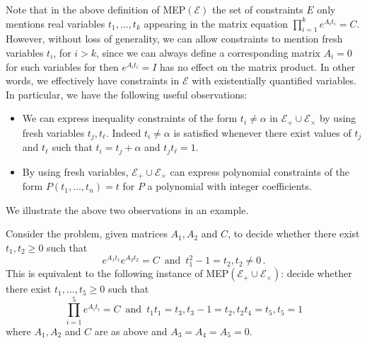 Note that in the above definition of MEP$(\mathcal{E})$ the set of
constraints $E$ only mentions real variables $t_1,\ldots,t_k$
appearing in the matrix equation $\prod_{i=1}^ke^{A_it_i}=C$.
However, without loss of generality, we can allow constraints to
mention fresh variables $t_i$, for $i>k$, since we can always define a
corresponding matrix $A_i=0$ for such variables for then
$e^{A_it_i}=I$ has no effect on the matrix product.  In other words,
we effectively have constraints in $\mathcal{E}$ with existentially
quantified variables.  In particular, we have the following
useful observations:

\begin{itemize}
\item[\textbullet] We can express inequality constraints of the form
  $t_i\neq \alpha$ in  $\mathcal{E}_{+}\cup \mathcal{E}_{\times}$ by
using fresh variables
  $t_j,t_\ell$.  Indeed $t_i \neq \alpha$ is satisfied whenever there
  exist values of $t_j$ and $t_{\ell}$ such that $t_i=t_j+\alpha$ and
  $t_jt_\ell=1$.

\item[\textbullet] By using fresh variables,
  $\mathcal{E}_{+}\cup \mathcal{E}_{\times}$ can express polynomial
  constraints of the form $P(t_1,\ldots,t_n)=t$ for $P$ a polynomial
  with integer coefficients.
\end{itemize}

We illustrate the above two observations in an example.
\begin{example}
  Consider the problem, given matrices $A_1,A_2$ and $C$, to decide
  whether there exist $t_1,t_2 \geq 0$ such that
  \[ e^{A_1t_1}e^{A_2t_2}=C \,\mbox{ and }\, t_1^2-1=t_2, t_2\neq 0 \, .\]
  This is equivalent to the following instance of
  MEP$(\mathcal{E}_{+}\cup\mathcal{E}_{\times})$: decide whether there exist $t_1,\ldots,t_5\geq 0$ such that
\[ \prod_{i=1}^5 e^{A_it_i}=C \,\mbox{ and }\, t_1t_1=t_3, t_3-1=t_2, t_2t_4=t_5, t_5=1\]
where $A_1,A_2$ and $C$ are as above and $A_3=A_4=A_5=0$.
\end{example}


